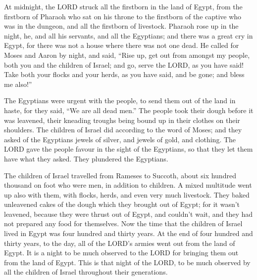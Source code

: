  At midnight, the LORD struck all the firstborn in the land
of Egypt, from the firstborn of Pharaoh who sat on his throne to the
firstborn of the captive who was in the dungeon, and all the firstborn
of livestock.  Pharaoh rose up in the night, he, and all
his servants, and all the Egyptians; and there was a great cry in Egypt,
for there was not a house where there was not one dead.  He
called for Moses and Aaron by night, and said, ``Rise up, get out from
amongst my people, both you and the children of Israel; and go, serve
the LORD, as you have said!  Take both your flocks and your
herds, as you have said, and be gone; and bless me also!''

 The Egyptians were urgent with the people, to send them
out of the land in haste, for they said, ``We are all dead men.''
 The people took their dough before it was leavened, their
kneading troughs being bound up in their clothes on their shoulders.
 The children of Israel did according to the word of Moses;
and they asked of the Egyptians jewels of silver, and jewels of gold,
and clothing.  The LORD gave the people favour in the sight
of the Egyptians, so that they let them have what they asked. They
plundered the Egyptians.

 The children of Israel travelled from Rameses to Succoth,
about six hundred thousand on foot who were men, in addition to
children.  A mixed multitude went up also with them, with
flocks, herds, and even very much livestock.  They baked
unleavened cakes of the dough which they brought out of Egypt; for it
wasn't leavened, because they were thrust out of Egypt, and couldn't
wait, and they had not prepared any food for themselves. 
Now the time that the children of Israel lived in Egypt was four hundred
and thirty years.  At the end of four hundred and thirty
years, to the day, all of the LORD's armies went out from the land of
Egypt.  It is a night to be much observed to the LORD for
bringing them out from the land of Egypt. This is that night of the
LORD, to be much observed by all the children of Israel throughout their
generations.

